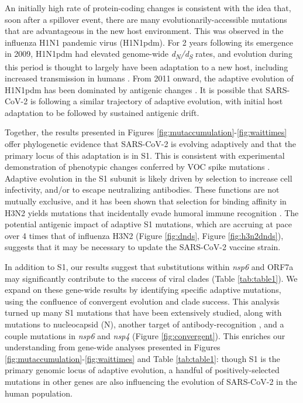 \documentclass[11pt,oneside,letterpaper]{article}
\begin{document}
An initially high rate of protein-coding changes is consistent with the idea that, soon after a spillover event, there are many evolutionarily-accessible mutations that are advantageous in the new host environment. 
This was observed in the influenza H1N1 pandemic virus (H1N1pdm). 
For 2 years following its emergence in 2009, H1N1pdm had elevated genome-wide \emph{d\textsubscript{N}/d\textsubscript{S}} rates, and evolution during this period is thought to largely have been adaptation to a new host, including increased transmission in humans \cite{Su2015-az}. 
From 2011 onward, the adaptive evolution of H1N1pdm has been dominated by antigenic changes \cite{Su2015-az}. 
It is possible that SARS-CoV-2 is following a similar trajectory of adaptive evolution, with initial host adaptation to be followed by sustained antigenic drift.

Together, the results presented in Figures \ref{fig:mutaccumulation}-\ref{fig:waittimes} offer phylogenetic evidence that SARS-CoV-2 is evolving adaptively and that the primary locus of this adaptation is in S1. 
This is consistent with experimental demonstration of phenotypic changes conferred by VOC spike mutations \cite{Wang2021-dm, Greaney2021-jn, Li2020-jd, Liu2021-ne}. 
Adaptive evolution in the S1 subunit is likely driven by selection to increase cell infectivity, and/or to escape neutralizing antibodies. 
These functions are not mutually exclusive, and it has been shown that selection for binding affinity in H3N2 yields mutations that incidentally evade humoral immune recognition \cite{Hensley2009-at}. 
The potential antigenic impact of adaptive S1 mutations, which are accruing at pace over 4 times that of influenza H3N2 (Figure \ref{fig:dnds}, Figure \ref{fig:h3n2dnds}), suggests that it may be necessary to update the SARS-CoV-2 vaccine strain.

In addition to S1, our results suggest that substitutions within \emph{nsp6} and ORF7a may significantly contribute to the success of viral clades (Table \ref{tab:table1}). 
We expand on these gene-wide results by identifying specific adaptive mutations, using the confluence of convergent evolution and clade success. 
This analysis turned up many S1 mutations that have been extensively studied, along with mutations to nucleocapsid (N), another target of antibody-recognition \cite{Kang2021-pe}, and a couple mutations in \emph{nsp6} and \emph{nsp4} (Figure \ref{fig:convergent}). 
This enriches our understanding from gene-wide analyses presented in Figures \ref{fig:mutaccumulation}-\ref{fig:waittimes} and Table \ref{tab:table1}: though S1 is the primary genomic locus of adaptive evolution, a handful of positively-selected mutations in other genes are also influencing the evolution of SARS-CoV-2 in the human population.
\end{document}
